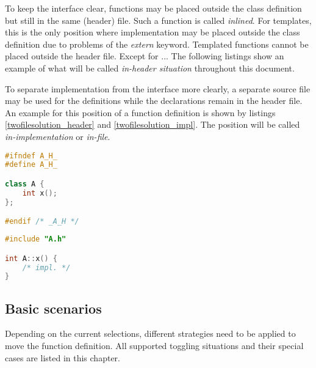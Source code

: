 To keep the interface clear,  functions may be 
placed outside the class definition but still in the same (header) file. Such a 
function is called \textit{inlined}. For templates, this is the only position 
where implementation may be placed outside the class definition due to problems 
of the \textit{extern} keyword. Templated functions cannot be placed outside the 
header file. Except for ... %
The following listings show an example of what will be called 
\textit{in-header situation} throughout this document.



To  separate implementation from the interface more 
clearly, a separate source file may be used for the definitions while the 
declarations remain in the header file. An example for this position of a 
function definition is shown by listings \ref{twofilesolution_header} and
\ref{twofilesolution_impl}. The position will be called 
\textit{in-implementation} or \textit{in-file}.

\vspace{0.5cm}
\begin{minipage}{.48\textwidth}
\lstset{xrightmargin=0.5cm}
\begin{lstlisting}[caption={A.h},label={twofilesolution_header},language=C++]
#ifndef A_H_
#define A_H_

class A {
	int x();
};

#endif /* _A_H */
\end{lstlisting}
\end{minipage}%
\begin{minipage}{.48\textwidth}
\lstset{xleftmargin=0.5cm}
\begin{lstlisting}[caption={A.cpp},label={twofilesolution_impl},language=C++]
#include "A.h"

int A::x() { 
    /* impl. */ 
}
\end{lstlisting}
\end{minipage}

\subsection{Basic scenarios}

Depending on the current selections, different strategies need to be applied to 
move the function definition. All supported toggling situations and their 
special cases are listed in this chapter.


